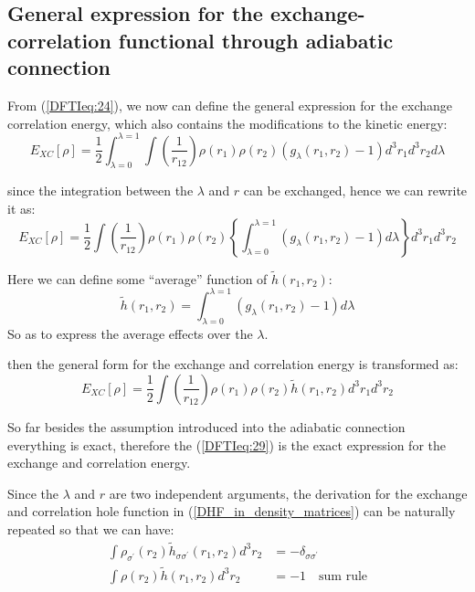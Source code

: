 \subsection{General expression for the exchange-correlation functional
through adiabatic connection}
%
%
%
%
From (\ref{DFTIeq:24}), we now can define the general expression for
the exchange correlation energy, which also contains the
modifications to the kinetic energy:
\begin{equation}\label{}
E_{XC}[\rho] = \frac{1}{2}\int^{\lambda = 1}_{\lambda = 0} \int
\left(\frac{1}{r_{12}}\right)
\rho(r_{1})\rho(r_{2})(g_{\lambda}(r_{1},
r_{2})-1)d^{3}r_{1}d^{3}r_{2} d\lambda
\end{equation}

since the integration between the $\lambda$ and $r$ can be
exchanged, hence we can rewrite it as:
\begin{equation}\label{}
E_{XC}[\rho] = \frac{1}{2} \int \left(\frac{1}{r_{12}}\right)
\rho(r_{1})\rho(r_{2})\left\{\int^{\lambda = 1}_{\lambda =
0}(g_{\lambda}(r_{1}, r_{2})-1)d\lambda \right\}d^{3}r_{1}d^{3}r_{2}
\end{equation}

Here we can define some ``average'' function of
$\widetilde{h}(r_{1}, r_{2})$:
\begin{equation}\label{}
\widetilde{h}(r_{1}, r_{2}) = \int^{\lambda = 1}_{\lambda =
0}(g_{\lambda}(r_{1}, r_{2})-1)d\lambda
\end{equation}
So as to express the average effects over the $\lambda$.

then the general form for the exchange and correlation energy is
transformed as:
\begin{equation}\label{DFTIeq:29}
E_{XC}[\rho] = \frac{1}{2} \int \left(\frac{1}{r_{12}}\right)
\rho(r_{1})\rho(r_{2})\widetilde{h}(r_{1},
r_{2})d^{3}r_{1}d^{3}r_{2}
\end{equation}

So far besides the assumption introduced into the adiabatic
connection everything is exact, therefore the (\ref{DFTIeq:29}) is
the exact expression for the exchange and correlation energy.

Since the $\lambda$ and $r$ are two independent arguments, the
derivation for the exchange and correlation hole function in
(\ref{DHF_in_density_matrices}) can be naturally repeated so that we
can have:
\begin{align}\label{DFTIeq:30}
  \int\rho_{\sigma^{'}}(r_{2})
  \widetilde{h}_{\sigma\sigma^{'}}(r_{1}, r_{2})d^{3}r_{2} &=
- \delta_{\sigma\sigma^{'}} \nonumber \\
  \int\rho(r_{2})
  \widetilde{h}(r_{1}, r_{2})d^{3}r_{2} &=
-1 \quad \text{sum rule}
\end{align}

